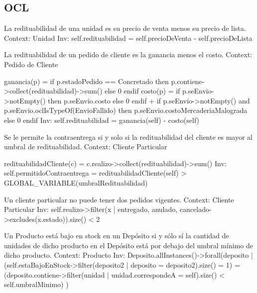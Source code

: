 \subsection{OCL}

\begin{listocl}

%
%
\begin{itemocl}{La redituabilidad de una unidad es su precio de venta menos su precio de lista.}
Context: Unidad
Inv: self.redituabilidad = self.precioDeVenta - self.precioDeLista
  \end{itemocl}


%
%
  \begin{itemocl}{La redituabilidad de un pedido de cliente es la ganancia menos el costo.}
Context: Pedido de Cliente

ganancia(p) = if p.estadoPedido == Concretado
	   then p.contiene->collect(redituabilidad)->sum()
	   else 0
	   endif
costo(p) = if p.seEnvio->notEmpty()
	then p.seEnvio.costo
	else 0
	endif
	+ if p.seEnvio->notEmpty() and p.seEnvio.oclIsTypeOf(EnvioFallido)
	then p.seEnvio.costoMercaderiaMalograda
	else 0
	endif
Inv: self.redituabilidad = ganancia(self) - costo(self)
  \end{itemocl}


%
%
  \begin{itemocl}{Se le permite la contraentrega si y solo si la redituabilidad del cliente es mayor al umbral de redituabilidad.}
Context: Cliente Particular

redituabilidadCliente(c) = c.realizo->collect(redituabilidad)->sum()
Inv: self.permitidoContraentrega = redituabilidadCliente(self) > GLOBAL_VARIABLE(umbralRedituabilidad)
  \end{itemocl}


%
%
  \begin{itemocl}{Un cliente particular no puede tener dos pedidos vigentes.}
Context: Cliente Particular
Inv: self.realizo->filter(x | {entregado, anulado, cancelado}->excludes(x.estado)).size() < 2
  \end{itemocl}

%
%
  \begin{itemocl}{Un Producto está bajo en stock en un Depósito si y sólo sí la cantidad de unidades de dicho producto en el Depósito está por debajo del umbral mínimo de dicho producto.}
Context: Producto
Inv: Deposito.allInstances()->forall(deposito |
    (self.estaBajoEnStock->filter(deposito2 | deposito = deposito2).size() = 1) =
    (deposito.contiene->filter(unidad | unidad.correspondeA = self).size() < self.umbralMinimo)
)
  \end{itemocl}


\end{listocl}
